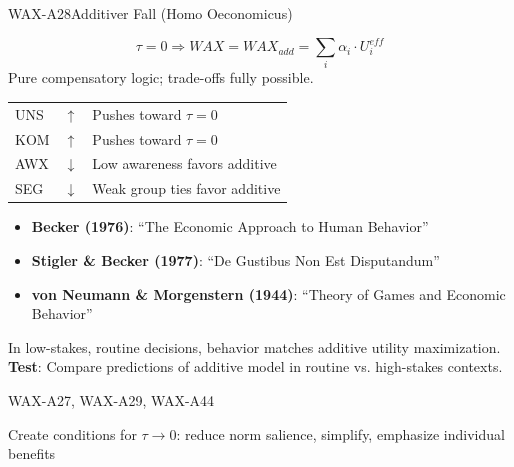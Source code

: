 
\begin{axiomspec}{WAX-A28}{Additiver Fall (Homo Oeconomicus)}

\begin{equation}
\tau = 0 \Rightarrow WAX = WAX_{add} = \sum_i \alpha_i \cdot U_i^{eff}
\end{equation}
Pure compensatory logic; trade-offs fully possible.

\begin{tabular}{lll}
UNS & $\uparrow$ & Pushes toward $\tau = 0$ \\
KOM & $\uparrow$ & Pushes toward $\tau = 0$ \\
AWX & $\downarrow$ & Low awareness favors additive \\
SEG & $\downarrow$ & Weak group ties favor additive \\
\end{tabular}

\begin{itemize}
\item \textbf{Becker (1976)}: ``The Economic Approach to Human Behavior''
\item \textbf{Stigler \& Becker (1977)}: ``De Gustibus Non Est Disputandum''
\item \textbf{von Neumann \& Morgenstern (1944)}: ``Theory of Games and Economic Behavior''
\end{itemize}

In low-stakes, routine decisions, behavior matches additive utility maximization.
\textbf{Test}: Compare predictions of additive model in routine vs. high-stakes contexts.

WAX-A27, WAX-A29, WAX-A44

Create conditions for $\tau \rightarrow 0$: reduce norm salience, simplify, emphasize individual benefits

\end{axiomspec}


